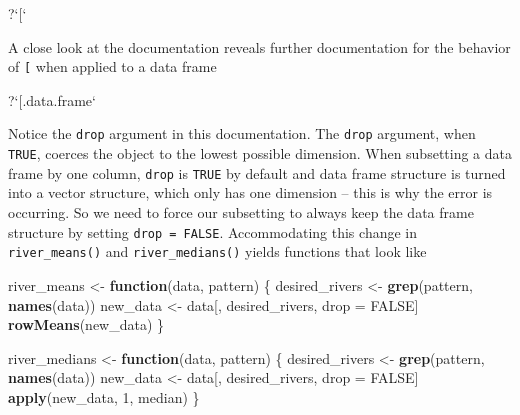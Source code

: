 \documentclass[
]{book}
\newenvironment{Shaded}{\begin{snugshade}}{\end{snugshade}}
\newcommand{\ControlFlowTok}[1]{\textcolor[rgb]{0.13,0.29,0.53}{\textbf{#1}}}
\newcommand{\DataTypeTok}[1]{\textcolor[rgb]{0.13,0.29,0.53}{#1}}
\newcommand{\DecValTok}[1]{\textcolor[rgb]{0.00,0.00,0.81}{#1}}
\newcommand{\KeywordTok}[1]{\textcolor[rgb]{0.13,0.29,0.53}{\textbf{#1}}}
\newcommand{\NormalTok}[1]{#1}
\newcommand{\OtherTok}[1]{\textcolor[rgb]{0.56,0.35,0.01}{#1}}
\newcommand{\StringTok}[1]{\textcolor[rgb]{0.31,0.60,0.02}{#1}}
\begin{document}
\begin{Shaded}
\begin{Highlighting}[]
\NormalTok{?}\StringTok{`}\DataTypeTok{[}\StringTok{`}
\end{Highlighting}
\end{Shaded}

A close look at the documentation reveals further documentation for the behavior of \texttt{{[}} when applied to a data frame

\begin{Shaded}
\begin{Highlighting}[]
\NormalTok{?}\StringTok{`}\DataTypeTok{[.data.frame}\StringTok{`}
\end{Highlighting}
\end{Shaded}

Notice the \texttt{drop} argument in this documentation. The \texttt{drop} argument, when \texttt{TRUE}, coerces the object to the lowest possible dimension. When subsetting a data frame by one column, \texttt{drop} is \texttt{TRUE} by default and data frame structure is turned into a vector structure, which only has one dimension -- this is why the error is occurring. So we need to force our subsetting to always keep the data frame structure by setting \texttt{drop\ =\ FALSE}. Accommodating this change in \texttt{river\_means()} and \texttt{river\_medians()} yields functions that look like

\begin{Shaded}
\begin{Highlighting}[]
\NormalTok{river_means <-}\StringTok{ }\ControlFlowTok{function}\NormalTok{(data, pattern) \{}
\NormalTok{  desired_rivers <-}\StringTok{ }\KeywordTok{grep}\NormalTok{(pattern, }\KeywordTok{names}\NormalTok{(data))}
\NormalTok{  new_data <-}\StringTok{ }\NormalTok{data[, desired_rivers, drop =}\StringTok{ }\OtherTok{FALSE}\NormalTok{]}
  \KeywordTok{rowMeans}\NormalTok{(new_data)}
\NormalTok{\}}

\NormalTok{river_medians <-}\StringTok{ }\ControlFlowTok{function}\NormalTok{(data, pattern) \{}
\NormalTok{  desired_rivers <-}\StringTok{ }\KeywordTok{grep}\NormalTok{(pattern, }\KeywordTok{names}\NormalTok{(data))}
\NormalTok{  new_data <-}\StringTok{ }\NormalTok{data[, desired_rivers, drop =}\StringTok{ }\OtherTok{FALSE}\NormalTok{]}
  \KeywordTok{apply}\NormalTok{(new_data, }\DecValTok{1}\NormalTok{, median)}
\NormalTok{\}}
\end{Highlighting}
\end{Shaded}
\end{document}
